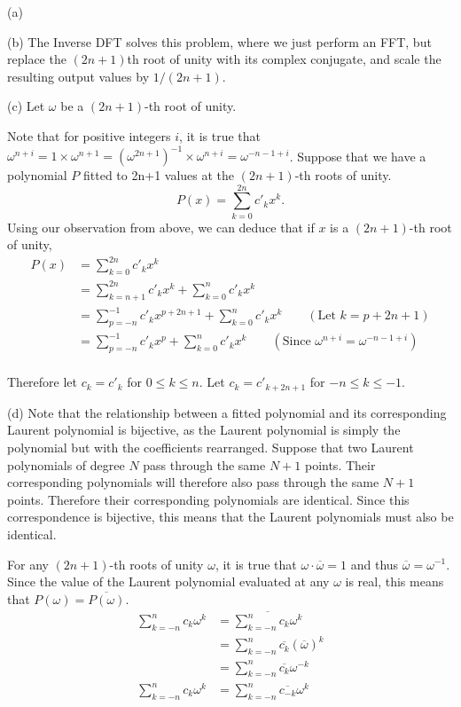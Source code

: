 \documentclass{article}
\begin{document}
\pagebreak

\begin{solution}

    (a)

    (b) The Inverse DFT solves this problem, where we just perform an FFT, 
    but replace the $(2n+1)$th root of unity with its complex conjugate, and scale the 
    resulting output values by $1/(2n+1)$.

    (c) Let $\omega$ be a $(2n+1)$-th root of unity.

    Note that for positive integers $i$, it is true that $\omega^{n+i}=1\times\omega^{n+1}=(\omega^{2n+1})^{-1}\times\omega^{n+i}=\omega^{-n-1+i}$.
    Suppose that we have a polynomial $P$ fitted to 2n+1 values at the $(2n+1)$-th roots of unity.
    $$P(x)=\sum_{k=0}^{2n}c'_kx^k.$$
    Using our observation from above, we can deduce that if $x$ is a $(2n+1)$-th root of unity,
    \begin{align*}
        P(x) &= \sum_{k=0}^{2n}c'_kx^k\\
        &= \sum_{k=n+1}^{2n}c'_kx^k + \sum_{k=0}^{n}c'_kx^k\\
        &= \sum_{p=-n}^{-1}c'_kx^{p+2n+1} + \sum_{k=0}^{n}c'_kx^k \qquad (\text{Let } k=p+2n+1)\\
        &= \sum_{p=-n}^{-1}c'_kx^{p} + \sum_{k=0}^{n}c'_kx^k \qquad (\text{Since } \omega^{n+i}=\omega^{-n-1+i})\\
    \end{align*}

    Therefore let $c_k=c'_k$ for $0\leq k \leq n$. Let $c_k=c'_{k+2n+1}$ for $-n\leq k \leq -1$.

    (d) Note that the relationship between a fitted polynomial and its corresponding Laurent polynomial is bijective,
    as the Laurent polynomial is simply the polynomial but with the coefficients rearranged.
    Suppose that two Laurent polynomials of degree $N$ pass through the same $N + 1$ points. 
    Their corresponding polynomials will therefore also pass through the same $N + 1$ points.
    Therefore their corresponding polynomials are identical.
    Since this correspondence is bijective, this means that the Laurent polynomials must also be identical.

    For any $(2n+1)$-th roots of unity $\omega$, it is true that $\omega \cdot \overline{\omega}=1$ and thus $\overline{\omega}=\omega^{-1}$.
    Since the value of the Laurent polynomial evaluated at any $\omega$ is real, this means that $P(\omega)=\overline{P(\omega)}$.
    \begin{align*}
        \sum_{k=-n}^{n}c_k\omega^k &= \overline{\sum_{k=-n}^{n}c_k\omega^k}\\
        &= \sum_{k=-n}^{n}\overline{c_k}(\overline{\omega})^k \\
        &= \sum_{k=-n}^{n}\overline{c_k}\omega^{-k} \\
        \sum_{k=-n}^{n}c_k\omega^k &= \sum_{k=-n}^{n}\overline{c_{-k}}\omega^{k}
    \end{align*}


\end{solution}
\end{document}

